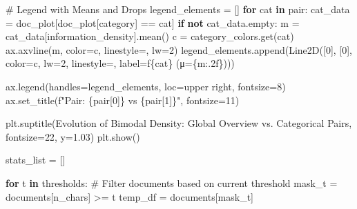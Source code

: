 \documentclass[
  italian,
  a4paper,
]{article}
\newenvironment{Shaded}{\begin{snugshade}}{\end{snugshade}}
\newcommand{\CommentTok}[1]{\textcolor[rgb]{0.37,0.37,0.37}{#1}}
\newcommand{\ControlFlowTok}[1]{\textcolor[rgb]{0.00,0.23,0.31}{\textbf{#1}}}
\newcommand{\DecValTok}[1]{\textcolor[rgb]{0.68,0.00,0.00}{#1}}
\newcommand{\FloatTok}[1]{\textcolor[rgb]{0.68,0.00,0.00}{#1}}
\newcommand{\KeywordTok}[1]{\textcolor[rgb]{0.00,0.23,0.31}{\textbf{#1}}}
\newcommand{\NormalTok}[1]{\textcolor[rgb]{0.00,0.23,0.31}{#1}}
\newcommand{\OperatorTok}[1]{\textcolor[rgb]{0.37,0.37,0.37}{#1}}
\newcommand{\SpecialCharTok}[1]{\textcolor[rgb]{0.37,0.37,0.37}{#1}}
\newcommand{\SpecialStringTok}[1]{\textcolor[rgb]{0.13,0.47,0.30}{#1}}
\newcommand{\StringTok}[1]{\textcolor[rgb]{0.13,0.47,0.30}{#1}}
\begin{document}
\begin{Shaded}
\begin{Highlighting}[]
        \CommentTok{\# Legend with Means and Drops}
\NormalTok{        legend\_elements }\OperatorTok{=}\NormalTok{ []}
        \ControlFlowTok{for}\NormalTok{ cat }\KeywordTok{in}\NormalTok{ pair:}
\NormalTok{            cat\_data }\OperatorTok{=}\NormalTok{ doc\_plot[doc\_plot[}\StringTok{\textquotesingle{}category\textquotesingle{}}\NormalTok{] }\OperatorTok{==}\NormalTok{ cat]}
            \ControlFlowTok{if} \KeywordTok{not}\NormalTok{ cat\_data.empty:}
\NormalTok{                m }\OperatorTok{=}\NormalTok{ cat\_data[}\StringTok{\textquotesingle{}information\_density\textquotesingle{}}\NormalTok{].mean()}
\NormalTok{                c }\OperatorTok{=}\NormalTok{ category\_colors.get(cat)}
\NormalTok{                ax.axvline(m, color}\OperatorTok{=}\NormalTok{c, linestyle}\OperatorTok{=}\StringTok{\textquotesingle{}{-}{-}\textquotesingle{}}\NormalTok{, lw}\OperatorTok{=}\DecValTok{2}\NormalTok{)}
\NormalTok{                legend\_elements.append(Line2D([}\DecValTok{0}\NormalTok{], [}\DecValTok{0}\NormalTok{], color}\OperatorTok{=}\NormalTok{c, lw}\OperatorTok{=}\DecValTok{2}\NormalTok{, linestyle}\OperatorTok{=}\StringTok{\textquotesingle{}{-}{-}\textquotesingle{}}\NormalTok{, }
\NormalTok{                                              label}\OperatorTok{=}\SpecialStringTok{f\textquotesingle{}}\SpecialCharTok{\{}\NormalTok{cat}\SpecialCharTok{\}}\SpecialStringTok{ (μ=}\SpecialCharTok{\{}\NormalTok{m}\SpecialCharTok{:.2f\}}\SpecialStringTok{)\textquotesingle{}}\NormalTok{))}

\NormalTok{        ax.legend(handles}\OperatorTok{=}\NormalTok{legend\_elements, loc}\OperatorTok{=}\StringTok{\textquotesingle{}upper right\textquotesingle{}}\NormalTok{, fontsize}\OperatorTok{=}\DecValTok{8}\NormalTok{)}
\NormalTok{        ax.set\_title(}\SpecialStringTok{f"Pair: }\SpecialCharTok{\{}\NormalTok{pair[}\DecValTok{0}\NormalTok{]}\SpecialCharTok{\}}\SpecialStringTok{ vs }\SpecialCharTok{\{}\NormalTok{pair[}\DecValTok{1}\NormalTok{]}\SpecialCharTok{\}}\SpecialStringTok{"}\NormalTok{, fontsize}\OperatorTok{=}\DecValTok{11}\NormalTok{)}

\NormalTok{plt.suptitle(}\StringTok{\textquotesingle{}Evolution of Bimodal Density: Global Overview vs. Categorical Pairs\textquotesingle{}}\NormalTok{, fontsize}\OperatorTok{=}\DecValTok{22}\NormalTok{, y}\OperatorTok{=}\FloatTok{1.03}\NormalTok{)}
\NormalTok{plt.show()}



\NormalTok{stats\_list }\OperatorTok{=}\NormalTok{ []}

\ControlFlowTok{for}\NormalTok{ t }\KeywordTok{in}\NormalTok{ thresholds:}
    \CommentTok{\# Filter documents based on current threshold}
\NormalTok{    mask\_t }\OperatorTok{=}\NormalTok{ documents[}\StringTok{\textquotesingle{}n\_chars\textquotesingle{}}\NormalTok{] }\OperatorTok{\textgreater{}=}\NormalTok{ t}
\NormalTok{    temp\_df }\OperatorTok{=}\NormalTok{ documents[mask\_t]}
    

\end{Highlighting}
\end{Shaded}
\end{document}
